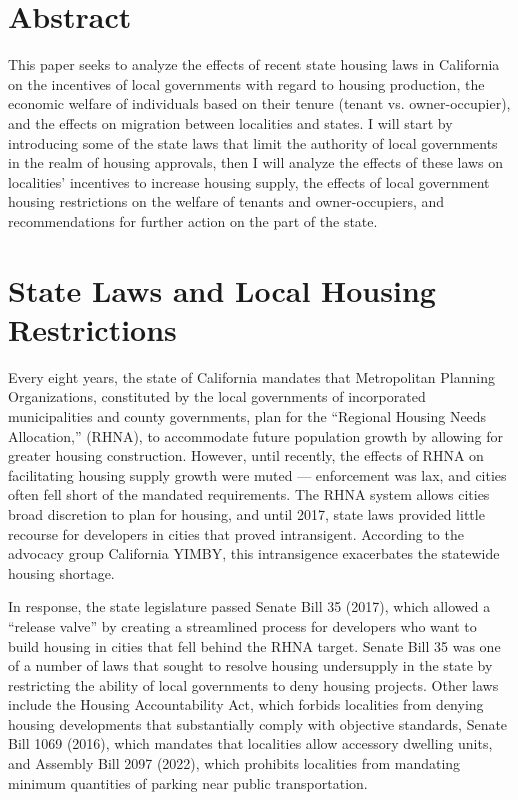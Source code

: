 \documentclass[12pt]{extarticle}
\title{}
\author{Avinash Iyer}
\date{}
\newlength\tindent
\renewcommand{\indent}{\hspace*{\tindent}}
\begin{document}
  \doublespacing
  \section*{Abstract}
  \indent This paper seeks to analyze the effects of recent state housing laws in California on the incentives of local governments with regard to housing production, the economic welfare of individuals based on their tenure (tenant vs. owner-occupier), and the effects on migration between localities and states. I will start by introducing some of the state laws that limit the authority of local governments in the realm of housing approvals, then I will analyze the effects of these laws on localities' incentives to increase housing supply, the effects of local government housing restrictions on the welfare of tenants and owner-occupiers, and recommendations for further action on the part of the state.
  \section*{State Laws and Local Housing Restrictions}%
  \indent Every eight years, the state of California mandates that Metropolitan Planning Organizations, constituted by the local governments of incorporated municipalities and county governments, plan for the ``Regional Housing Needs Allocation,'' (RHNA), to accommodate future population growth by allowing for greater housing construction.\supercite{rhna} However, until recently, the effects of RHNA on facilitating housing supply growth were muted --- enforcement was lax, and cities often fell short of the mandated requirements. The RHNA system allows cities broad discretion to plan for housing, and until 2017, state laws provided little recourse for developers in cities that proved intransigent. According to the advocacy group California YIMBY, this intransigence exacerbates the statewide housing shortage.

  \indent In response, the state legislature passed Senate Bill 35 (2017), which allowed a ``release valve'' by creating a streamlined process for developers who want to build housing in cities that fell behind the RHNA target.\supercite{sb_35_423} Senate Bill 35 was one of a number of laws that sought to resolve housing undersupply in the state by restricting the ability of local governments to deny housing projects. Other laws include the Housing Accountability Act, which forbids localities from denying housing developments that substantially comply with objective standards, Senate Bill 1069 (2016), which mandates that localities allow accessory dwelling units,\supercite{sb_1069} and Assembly Bill 2097 (2022), which prohibits localities from mandating minimum quantities of parking near public transportation.\supercite{ab_2097}
\end{document}
